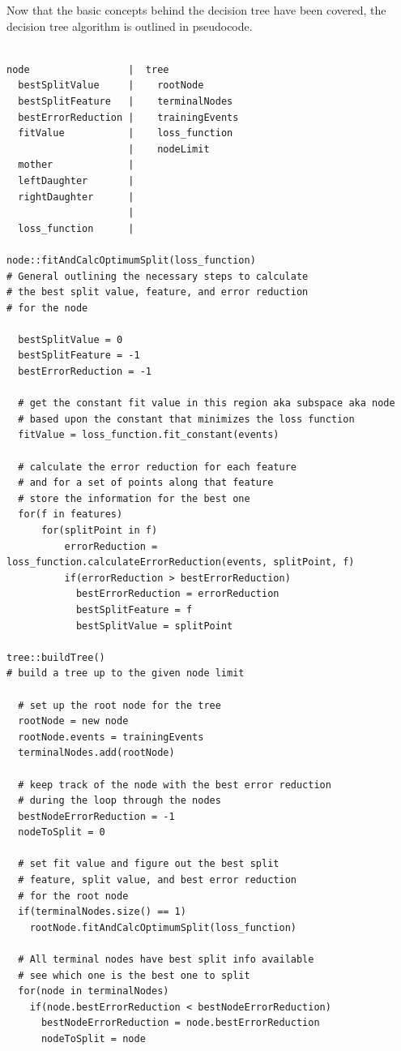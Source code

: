 \documentclass[12pt]{article}
\begin{document}
Now that the basic concepts behind the decision tree have been covered, the decision tree algorithm is outlined in pseudocode.

\begin{verbatim}

node                 |  tree
  bestSplitValue     |    rootNode
  bestSplitFeature   |    terminalNodes
  bestErrorReduction |    trainingEvents
  fitValue           |    loss_function
                     |    nodeLimit
  mother             |    
  leftDaughter       |
  rightDaughter      |
                     |
  loss_function      |

node::fitAndCalcOptimumSplit(loss_function)
# General outlining the necessary steps to calculate
# the best split value, feature, and error reduction
# for the node

  bestSplitValue = 0
  bestSplitFeature = -1
  bestErrorReduction = -1

  # get the constant fit value in this region aka subspace aka node
  # based upon the constant that minimizes the loss function
  fitValue = loss_function.fit_constant(events)

  # calculate the error reduction for each feature
  # and for a set of points along that feature
  # store the information for the best one
  for(f in features)
      for(splitPoint in f)
          errorReduction = loss_function.calculateErrorReduction(events, splitPoint, f)
          if(errorReduction > bestErrorReduction)
            bestErrorReduction = errorReduction
            bestSplitFeature = f
            bestSplitValue = splitPoint

tree::buildTree()
# build a tree up to the given node limit

  # set up the root node for the tree
  rootNode = new node
  rootNode.events = trainingEvents
  terminalNodes.add(rootNode)

  # keep track of the node with the best error reduction
  # during the loop through the nodes
  bestNodeErrorReduction = -1
  nodeToSplit = 0

  # set fit value and figure out the best split
  # feature, split value, and best error reduction
  # for the root node
  if(terminalNodes.size() == 1)
    rootNode.fitAndCalcOptimumSplit(loss_function)

  # All terminal nodes have best split info available
  # see which one is the best one to split
  for(node in terminalNodes)
    if(node.bestErrorReduction < bestNodeErrorReduction)
      bestNodeErrorReduction = node.bestErrorReduction
      nodeToSplit = node


\end{verbatim}
\end{document}
